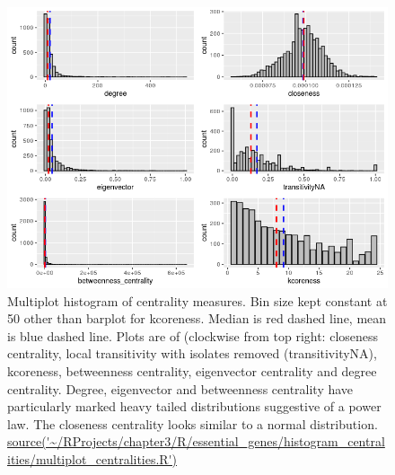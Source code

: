 \begin{figure}
    \centering
    \includegraphics[width=\textwidth]{images/chapter3/ggplot2/Rplot_histogram+_centrality_multiplot.png}
    \caption[Multiplot histogram of centrality measures]{Multiplot histogram of centrality measures. Bin size kept constant at 50 other than barplot for kcoreness. Median is red dashed line, mean is blue dashed line. Plots are of (clockwise from top right: closeness centrality, local transitivity with isolates removed (transitivityNA), kcoreness, betweenness centrality, eigenvector centrality and degree centrality. Degree, eigenvector and betweenness centrality have particularly marked heavy tailed distributions suggestive of a power law. The closeness centrality looks similar to a normal distribution.   \url{source('~/RProjects/chapter3/R/essential_genes/histogram_centralities/multiplot_centralities.R')}}
    \label{fig:multiplot centrality histograms}
\end{figure}


       

